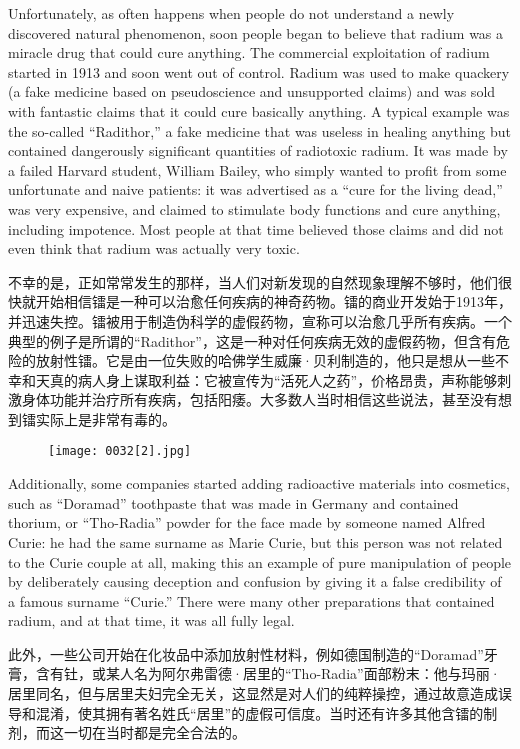 \documentclass[dvipsnames, svgnames,a4paper,11pt]{article}
\begin{document}
Unfortunately, as often happens when people do not understand a newly discovered natural phenomenon, soon people began to believe that radium was a miracle drug that could cure anything. The commercial exploitation of radium started in 1913 and soon went out of control. Radium was used to make quackery (a fake medicine based on pseudoscience and unsupported claims) and was sold with fantastic claims that it could cure basically anything. A typical example was the so-called “Radithor,” a fake medicine that was useless in healing anything but contained dangerously significant quantities of radiotoxic radium. It was made by a failed Harvard student, William Bailey, who simply wanted to profit from some unfortunate and naive patients: it was advertised as a “cure for the living dead,” was very expensive, and claimed to stimulate body functions and cure anything, including impotence. Most people at that time believed those claims and did not even think that radium was actually very toxic.

不幸的是，正如常常发生的那样，当人们对新发现的自然现象理解不够时，他们很快就开始相信镭是一种可以治愈任何疾病的神奇药物。镭的商业开发始于1913年，并迅速失控。镭被用于制造伪科学的虚假药物，宣称可以治愈几乎所有疾病。一个典型的例子是所谓的“Radithor”，这是一种对任何疾病无效的虚假药物，但含有危险的放射性镭。它是由一位失败的哈佛学生威廉·贝利制造的，他只是想从一些不幸和天真的病人身上谋取利益：它被宣传为“活死人之药”，价格昂贵，声称能够刺激身体功能并治疗所有疾病，包括阳痿。大多数人当时相信这些说法，甚至没有想到镭实际上是非常有毒的。

\begin{figure}[htbp]
      \centering
      \texttt{[image: 0032[2].jpg]}
       \label{fig20}
\end{figure}

Additionally, some companies started adding radioactive materials into cosmetics, such as “Doramad” toothpaste that was made in Germany and contained thorium, or “Tho-Radia” powder for the face made by someone named Alfred Curie: he had the same surname as Marie Curie, but this person was not related to the Curie couple at all, making this an example of pure manipulation of people by deliberately causing deception and confusion by giving it a false credibility of a famous surname “Curie.” There were many other preparations that contained radium, and at that time, it was all fully legal.

此外，一些公司开始在化妆品中添加放射性材料，例如德国制造的“Doramad”牙膏，含有钍，或某人名为阿尔弗雷德·居里的“Tho-Radia”面部粉末：他与玛丽·居里同名，但与居里夫妇完全无关，这显然是对人们的纯粹操控，通过故意造成误导和混淆，使其拥有著名姓氏“居里”的虚假可信度。当时还有许多其他含镭的制剂，而这一切在当时都是完全合法的。
\end{document}

